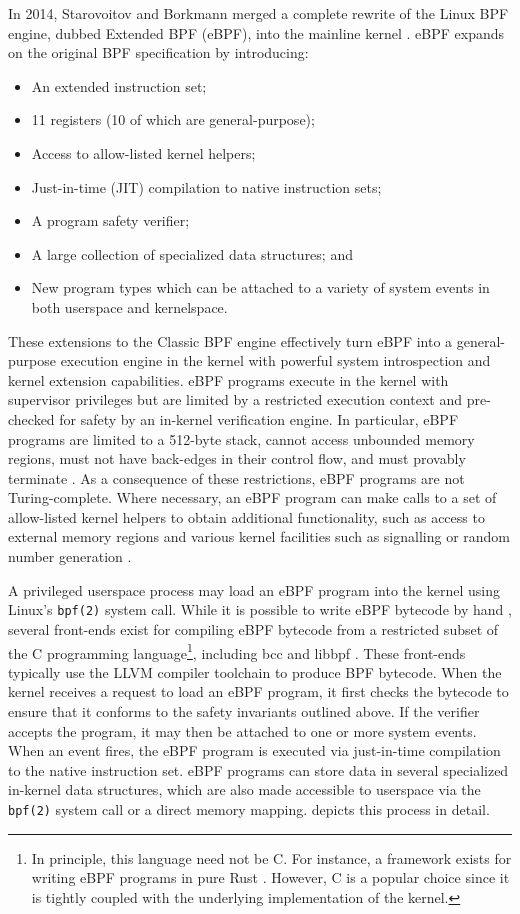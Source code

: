 In 2014, Starovoitov and Borkmann merged a complete rewrite of the Linux BPF engine, dubbed Extended BPF (eBPF), into the mainline kernel \cite{starovoitov2014_ebpf}. eBPF expands on the original BPF specification by introducing:
\begin{itemize}
  \item An extended instruction set;
  \item 11 registers (10 of which are general-purpose);
  \item Access to allow-listed kernel helpers;
  \item Just-in-time (JIT) compilation to native instruction sets;
  \item A program safety verifier;
  \item A large collection of specialized data structures; and
  \item New program types which can be attached to a variety of system events in both userspace and kernelspace.
\end{itemize}
These extensions to the Classic BPF engine effectively turn eBPF into a general-purpose execution engine in the kernel with powerful system introspection and kernel extension capabilities. eBPF programs execute in the kernel with supervisor privileges but are limited by a restricted execution context and pre-checked for safety by an in-kernel verification engine. In particular, eBPF programs are limited to a 512-byte stack, cannot access unbounded memory regions, must not have back-edges in their control flow, and must provably terminate \cite{gregg2019_bpf}. As a consequence of these restrictions, eBPF programs are not Turing-complete. Where necessary, an eBPF program can make calls to a set of allow-listed kernel helpers to obtain additional functionality, such as access to external memory regions and various kernel facilities such as signalling or random number generation \cite{gregg2019_bpf}.

A privileged userspace process may load an eBPF program into the kernel using Linux's \texttt{bpf(2)} system call. While it is possible to write eBPF bytecode by hand \cite{gregg2019_bpf}, several front-ends exist for compiling eBPF bytecode from a restricted subset of the C programming language\footnote{In principle, this language need not be C. For instance, a framework exists for writing eBPF programs in pure Rust \cite{redbpf}. However, C is a popular choice since it is tightly coupled with the underlying implementation of the kernel.}, including bcc \cite{bcc} and libbpf \cite{libbpf}. These front-ends typically use the LLVM \cite{llvm_bpf} compiler toolchain to produce BPF bytecode. When the kernel receives a request to load an eBPF program, it first checks the bytecode to ensure that it conforms to the safety invariants outlined above. If the verifier accepts the program, it may then be attached to one or more system events. When an event fires, the eBPF program is executed via just-in-time compilation to the native instruction set. eBPF programs can store data in several specialized in-kernel data structures, which are also made accessible to userspace via the \texttt{bpf(2)} system call or a direct memory mapping.  depicts this process in detail.

